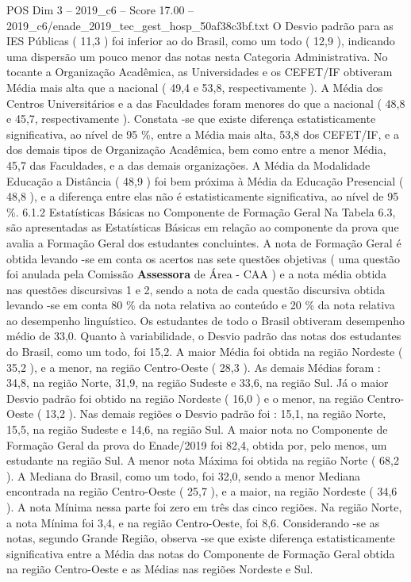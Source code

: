 \begin{textsample}{POS Dim 3 – 2019\_c6 – Score 17.00 – 2019\_c6/enade\_2019\_tec\_gest\_hosp\_50af38c3bf.txt}
O Desvio padrão para as IES Públicas ( 11,3 ) foi inferior ao do Brasil, como um todo ( 12,9 ), indicando uma dispersão um pouco menor das notas nesta Categoria Administrativa.
No tocante a Organização Acadêmica, as Universidades e os CEFET/IF obtiveram Média mais alta que a nacional ( 49,4 e 53,8, respectivamente ).
A Média dos Centros Universitários e a das Faculdades foram menores do que a nacional ( 48,8 e 45,7, respectivamente ).
Constata -se que existe diferença estatisticamente significativa, ao nível de 95 \%, entre a Média mais alta, 53,8 dos CEFET/IF, e a dos demais tipos de Organização Acadêmica, bem como entre a menor Média, 45,7 das Faculdades, e a das demais organizações.
A Média da Modalidade Educação a Distância ( 48,9 ) foi bem próxima à Média da Educação Presencial ( 48,8 ), e a diferença entre elas não é estatisticamente significativa, ao nível de 95 \%. 6.1.2 Estatísticas Básicas no Componente de Formação Geral Na Tabela 6.3, são apresentadas as Estatísticas Básicas em relação ao componente da prova que avalia a Formação Geral dos estudantes concluintes.
A nota de Formação Geral é obtida levando -se em conta os acertos nas sete questões objetivas ( uma questão foi anulada pela Comissão \textbf{Assessora} de Área - CAA ) e a nota média obtida nas questões discursivas 1 e 2, sendo a nota de cada questão discursiva obtida levando -se em conta 80 \% da nota relativa ao conteúdo e 20 \% da nota relativa ao desempenho linguístico.
Os estudantes de todo o Brasil obtiveram desempenho médio de 33,0.
Quanto à variabilidade, o Desvio padrão das notas dos estudantes do Brasil, como um todo, foi 15,2.
A maior Média foi obtida na região Nordeste ( 35,2 ), e a menor, na região Centro-Oeste ( 28,3 ).
As demais Médias foram : 34,8, na região Norte, 31,9, na região Sudeste e 33,6, na região Sul.
Já o maior Desvio padrão foi obtido na região Nordeste ( 16,0 ) e o menor, na região Centro-Oeste ( 13,2 ).
Nas demais regiões o Desvio padrão foi : 15,1, na região Norte, 15,5, na região Sudeste e 14,6, na região Sul.
A maior nota no Componente de Formação Geral da prova do Enade/2019 foi 82,4, obtida por, pelo menos, um estudante na região Sul.
A menor nota Máxima foi obtida na região Norte ( 68,2 ).
A Mediana do Brasil, como um todo, foi 32,0, sendo a menor Mediana encontrada na região Centro-Oeste ( 25,7 ), e a maior, na região Nordeste ( 34,6 ).
A nota Mínima nessa parte foi zero em três das cinco regiões.
Na região Norte, a nota Mínima foi 3,4, e na região Centro-Oeste, foi 8,6.
Considerando -se as notas, segundo Grande Região, observa -se que existe diferença estatisticamente significativa entre a Média das notas do Componente de Formação Geral obtida na região Centro-Oeste e as Médias nas regiões Nordeste e Sul.

\end{textsample}
